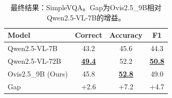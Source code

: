 \begin{table}[htbp]
\centering
\caption{最终结果：Chinese SimpleVQA。Gap为Ovis2.5\_9B相对Qwen2.5-VL-7B的增益。}
\label{tab:wk_final_chinese}
\small
\renewcommand{\arraystretch}{1.3}

\end{table}

\begin{table}[htbp]
\centering
\caption{最终结果：SimpleVQA。Gap为Ovis2.5\_9B相对Qwen2.5-VL-7B的增益。}
\label{tab:wk_final_english}
\small
\renewcommand{\arraystretch}{1.3}
\begin{tabular}{lccc}
\toprule
Model & Correct & Accuracy & F1 \\
\midrule
Qwen2.5-VL-7B & 43.2 & 45.6 & 44.3 \\
Qwen2.5-VL-72B & \textbf{\underline{49.4}} & 52.2 & \textbf{\underline{50.8}} \\
Ovis2.5\_9B (Ours) & 45.8 & \textbf{\underline{52.8}} & 49.0 \\
\midrule
Gap & +2.6 & +7.2 & +4.7 \\
\bottomrule
\end{tabular}

\end{table}

